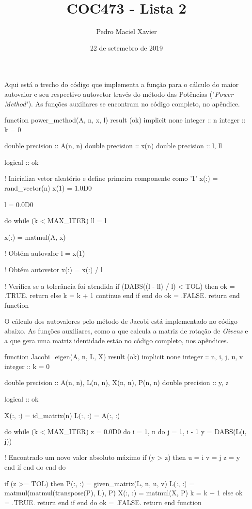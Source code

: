 \documentclass{homework}
\title{COC473 - Lista 2}
\author{Pedro Maciel Xavier}
\date{22 de setemebro de 2019}
\begin{document}
	
	\maketitle
	
	\quest%
	
	Aqui está o trecho do código que implementa a função para o cálculo do maior autovalor e seu respectivo autovetor través do método das Potências ("\textit{Power Method}"). As funções auxiliares se encontram no código completo, no apêndice.
	
	\begin{fortran}
	function power_method(A, n, x, l) result (ok)
		implicit none
		integer :: n
		integer :: k = 0
		
		double precision :: A(n, n)
		double precision :: x(n)
		double precision :: l, ll
		
		logical :: ok
		
	!   Inicializa vetor aleatório e define primeira componente como '1'
		x(:) = rand_vector(n)
		x(1) = 1.0D0
		
		l = 0.0D0
		
		do while (k < MAX_ITER)
			ll = l
			
			x(:) = matmul(A, x)                
			
	!	    Obtém autovalor
			l = x(1)
			
	!		Obtém autovetor                
			x(:) = x(:) / l
			
	!		Verifica se a tolerância foi atendida			
			if (DABS((l - ll) / l) < TOL) then
				ok = .TRUE.
				return
			else 
				k = k + 1
				continue
			end if
		end do
		ok = .FALSE.
		return
	end function
	\end{fortran}
	 
	\quest%
	
	O cálculo dos autovalores pelo método de Jacobi está implementado no código abaixo. As funções auxiliares, como a que calcula a matriz de rotação de \textit{Givens} e a que gera uma matriz identidade estão no código completo, nos apêndices.
	
	\begin{fortran}
	function Jacobi_eigen(A, n, L, X) result (ok)
		implicit none
		integer :: n, i, j, u, v
		integer :: k = 0
		
		double precision :: A(n, n), L(n, n), X(n, n), P(n, n)
		double precision :: y, z
		
		logical :: ok
		
		X(:, :) = id_matrix(n)
		L(:, :) = A(:, :)
		
		do while (k < MAX_ITER)
			z = 0.0D0
			do i = 1, n
				do j = 1, i - 1
					y = DABS(L(i, j))
					
	!	            Encontrado um novo valor absoluto máximo                        
					if (y > z) then
						u = i
						v = j
						z = y
					end if
				end do
			end do
			
			if (z >= TOL) then
				P(:, :) = given_matrix(L, n, u, v)
				L(:, :) = matmul(matmul(transpose(P), L), P)
				X(:, :) = matmul(X, P)
				k = k + 1
			else
				ok = .TRUE.
				return
			end if
		end do
		ok = .FALSE.
		return
	end function	
	\end{fortran}
	
\end{document}
